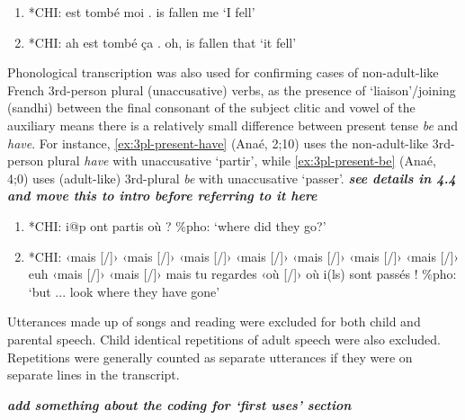 \documentclass[
  12pt,
]{article}
\begin{document}
\begin{enumerate}[resume*]
  \item{*CHI:   est tombé moi . \label{ex:non-adult-like-1}} \newline
              is fallen me \newline
              `I fell'
  \item{*CHI:   ah est tombé ça . \label{ex:non-adult-like-2}} \newline
              oh, is fallen that \newline
              `it fell'
  \end{enumerate}

Phonological transcription was also used for confirming cases of non-adult-like French 3rd-person plural (unaccusative) verbs, as the presence of `liaison'/joining (sandhi) between the final consonant of the subject clitic and vowel of the auxiliary means there is a relatively small difference between present tense \emph{be} and \emph{have}. For instance, \ref{ex:3pl-present-have} (Anaé, 2;10) uses the non-adult-like 3rd-person plural \emph{have} with unaccusative `partir', while \ref{ex:3pl-present-be} (Anaé, 4;0) uses (adult-like) 3rd-plural \emph{be} with unaccusative `passer'. \textbf{\emph{see details in 4.4 and move this to intro before referring to it here}}

\begin{enumerate}[resume*]
  \item{*CHI:   i@p ont partis où ? \label{ex:3pl-present-have}} \newline
        \%pho:  \newline 
        `where did they go?'
  \item{*CHI:   ‹mais [/]› ‹mais [/]› ‹mais [/]› ‹mais [/]› ‹mais [/]› ‹mais [/]› ‹mais [/]› euh ‹mais [/]› ‹mais [/]› mais tu regardes ‹où [/]› où i(ls) sont passés !\label{ex:3pl-present-be}} \newline
        \%pho:  \newline 
        `but ... look where they have gone'
  \end{enumerate}

Utterances made up of songs and reading were excluded for both child and parental speech. Child identical repetitions of adult speech were also excluded. Repetitions were generally counted as separate utterances if they were on separate lines in the transcript.

\textbf{\emph{add something about the coding for `first uses' section}}
\end{document}
